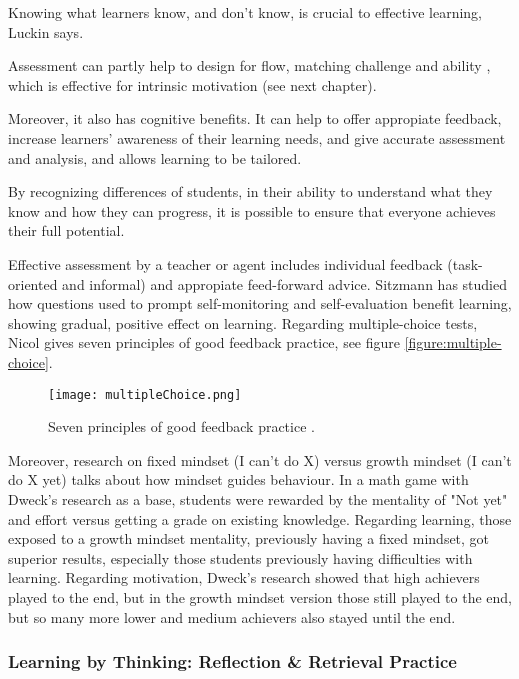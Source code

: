   Knowing what learners know, and don't know, is crucial to effective learning, Luckin \citep{luckin} says.

  Assessment can partly help to design for flow, matching challenge and ability \citep{bruhlmann}, which is effective for intrinsic motivation (see next chapter).

  Moreover, it also has cognitive benefits. It can help to offer appropiate feedback, increase learners' awareness of their learning needs, and give accurate assessment and analysis, and allows learning to be tailored.

  By recognizing differences of students, in their ability to understand what they know and how they can progress, it is possible to ensure that everyone achieves their full potential.

  Effective assessment by a teacher or agent includes individual feedback (task-oriented and informal) and appropiate feed-forward advice. Sitzmann \cite{sitzmann} has studied how questions used to prompt self-monitoring and self-evaluation benefit learning, showing gradual, positive effect on learning. Regarding multiple-choice tests, Nicol \cite{nicol} gives seven principles of good feedback practice, see figure \ref{figure:multiple-choice}.

  \begin{figure}[h]
    \centering
    \texttt{[image: multipleChoice.png]}
    \caption{Seven principles of good feedback practice \cite{nicol}.}
    \label{fig:sierra-practice}
\end{figure}

  Moreover, research on fixed mindset (I can't do X) versus growth mindset (I can't do X yet) talks about how mindset guides behaviour. In a math game with Dweck's research \cite{dweck-youtube} as a base, students were rewarded by the mentality of "Not yet" and effort versus getting a grade on existing knowledge. Regarding learning, those exposed to a growth mindset mentality, previously having a fixed mindset, got superior results, especially those students previously having difficulties with learning. Regarding motivation, Dweck's research showed that high achievers played to the end, but in the growth mindset version those still played to the end, but so many more lower and medium achievers also stayed until the end. \cite{dweck-youtube} 

  \subsubsection{Learning by Thinking: Reflection \& Retrieval Practice}

